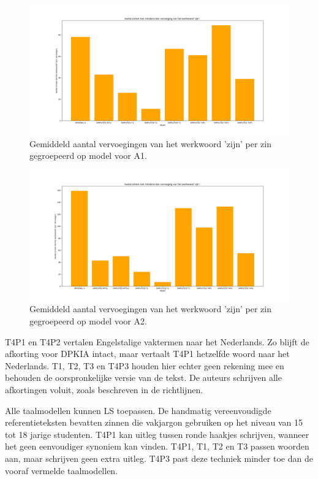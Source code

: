 \begin{figure}
	\includegraphics[width=\linewidth]{img/boxplot-tobe-a1.png}
	\caption{Gemiddeld aantal vervoegingen van het werkwoord 'zijn' per zin gegroepeerd op model voor A1.}
	\label{img:histplot-tobe-a1}
\end{figure}

\begin{figure}
	\includegraphics[width=\linewidth]{img/boxplot-tobe-a2.png}
	\caption{Gemiddeld aantal vervoegingen van het werkwoord 'zijn' per zin gegroepeerd op model voor A2.}
	\label{img:histplot-tobe-a2}
\end{figure}

T4P1 en T4P2 vertalen Engelstalige vaktermen naar het Nederlands. Zo blijft de afkorting voor DPKIA intact, maar vertaalt T4P1 hetzelfde woord naar het Nederlands.  T1, T2, T3 en T4P3 houden hier echter geen rekening mee en behouden de oorspronkelijke versie van de tekst. De auteurs schrijven alle afkortingen voluit, zoals beschreven in de richtlijnen.

\medspace

Alle taalmodellen kunnen LS toepassen. De handmatig vereenvoudigde referentieteksten bevatten zinnen die vakjargon gebruiken op het niveau van 15 tot 18 jarige studenten. T4P1 kan uitleg tussen ronde haakjes schrijven, wanneer het geen eenvoudiger synoniem kan vinden. T4P1, T1, T2 en T3 passen woorden aan, maar schrijven geen extra uitleg. T4P3 past deze techniek minder toe dan de vooraf vermelde taalmodellen.

